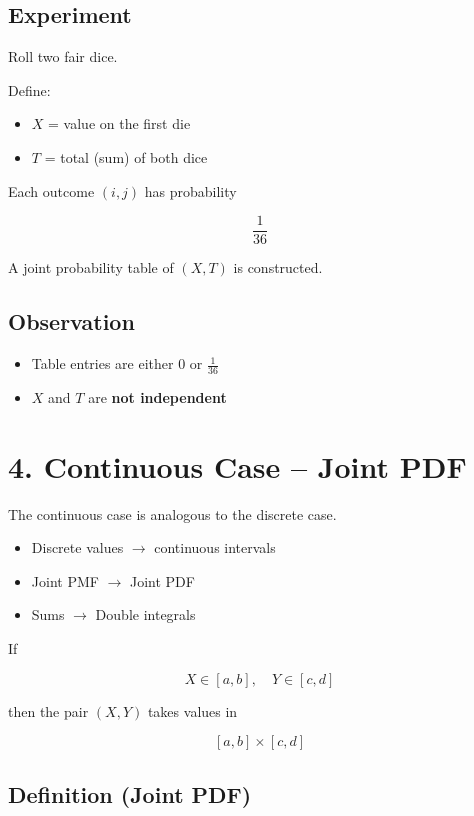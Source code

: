 \documentclass[12pt]{article}
\begin{document}
\subsection*{Experiment}

Roll two fair dice.

Define:

\begin{itemize}
\item $X$ = value on the first die
\item $T$ = total (sum) of both dice
\end{itemize}

Each outcome $(i,j)$ has probability

\[
\frac{1}{36}
\]

A joint probability table of $(X,T)$ is constructed.

\subsection*{Observation}

\begin{itemize}
\item Table entries are either $0$ or $\frac{1}{36}$
\item $X$ and $T$ are \textbf{not independent}
\end{itemize}

\section*{4. Continuous Case -- Joint PDF}

The continuous case is analogous to the discrete case.

\begin{itemize}
\item Discrete values $\rightarrow$ continuous intervals
\item Joint PMF $\rightarrow$ Joint PDF
\item Sums $\rightarrow$ Double integrals
\end{itemize}

If

\[
X \in [a,b], \quad Y \in [c,d]
\]

then the pair $(X,Y)$ takes values in

\[
[a,b] \times [c,d]
\]

\subsection*{Definition (Joint PDF)}
\end{document}
